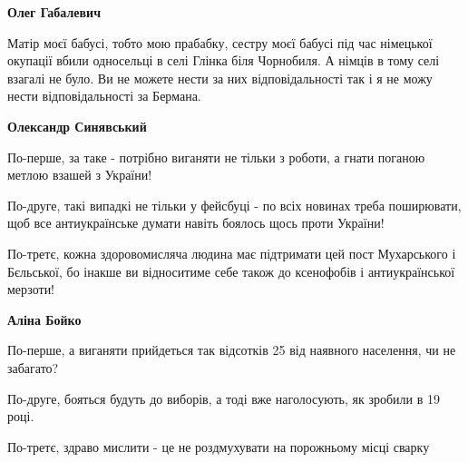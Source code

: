 \begin{itemize}
\begin{itemize}
\begin{itemize}
 
\textbf{Олег Габалевич} 

Матір моєї бабусі, тобто мою прабабку, сестру моєї бабусі під час німецької
окупації вбили односельці в селі Глінка біля Чорнобиля. А німців в тому селі
взагалі не було. Ви не можете нести за них відповідальності так і я не можу
нести відповідальності за Бермана.
\end{itemize}

 
\textbf{Олександр Синявський} 

По-перше, за таке - потрібно виганяти не тільки з роботи, а гнати поганою
метлою взашей з України! 

По-друге, такі випадкі не тільки у фейсбуці - по всіх новинах треба поширювати,
щоб все антиукраїнське думати навіть боялось щось проти України! 

По-третє, кожна здоровомисляча людина має підтримати цей пост Мухарського і
Бєльської, бо інакше ви відноситиме себе також до ксенофобів і антиукраїнської
мерзоти!

\begin{itemize}
 
\textbf{Аліна Бойко} 

По-перше, а виганяти прийдеться так відсотків 25 від наявного населення, чи не
забагато? 

По-друге, бояться будуть до виборів, а тоді вже наголосують, як зробили в 19
році. 

По-третє, здраво мислити - це не роздмухувати на порожньому місці сварку

 

\end{itemize}
\end{itemize}
\end{itemize}
